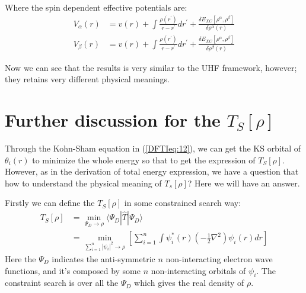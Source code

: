Where the spin dependent effective potentials are:
\begin{align}
  \label{DFTIeq:82}
V_{\alpha}(r) &= v(r) + \int\frac{\rho(r^{'})}{r -
  r^{'}}dr^{'} +
\frac{\delta E_{XC}[\rho^{\alpha}, \rho^{\beta}]}{\delta
  \rho^{\alpha}(r)} \nonumber \\
V_{\beta}(r) &= v(r) + \int\frac{\rho(r^{'})}{r -
  r^{'}}dr^{'} +
\frac{\delta E_{XC}[\rho^{\alpha}, \rho^{\beta}]}{\delta
  \rho^{\beta}(r)}
\end{align}

Now we can see that the results is very similar to the UHF
framework, however; they retains very different physical meanings.



\section{Further discussion for the $T_{S}[\rho]$}
\label{DFTI:3}
%
%
Through the Kohn-Sham equation in (\ref{DFTIeq:12}), we can get the
KS orbital of $\theta_{i}(r)$ to minimize the whole energy so that to
get the expression of $T_{S}[\rho]$. However, as in the derivation of total
energy expression, we have a question that how to understand the physical
meaning of $T_{s}[\rho]$? Here we will have an answer.

Firstly we can define the $T_{S}[\rho]$ in some constrained search way:
\begin{equation}\label{}
\begin{split}
T_{S}[\rho] &= \min_{\Psi_{D} \rightarrow \rho}
\langle\Psi_{D}|\hat{T}|\Psi_{D}\rangle \\
    &= \min_{\sum_{i=1}^{n}|\psi_{i}|^{2} \rightarrow \rho}
    \left[\sum_{i=1}^{n}\int\psi^{*}_{i}(r)
    \left(-\frac{1}{2}\nabla^{2}\right)\psi_{i}(r)dr\right]
\end{split}
\end{equation}
Here the $\Psi_{D}$ indicates the anti-symmetric $n$ non-interacting 
electron wave functions, and it's composed by some $n$ non-interacting
orbitals of $\psi_{i}$. The constraint search is over all the $\Psi_{D}$ 
which gives the real density of $\rho$.


